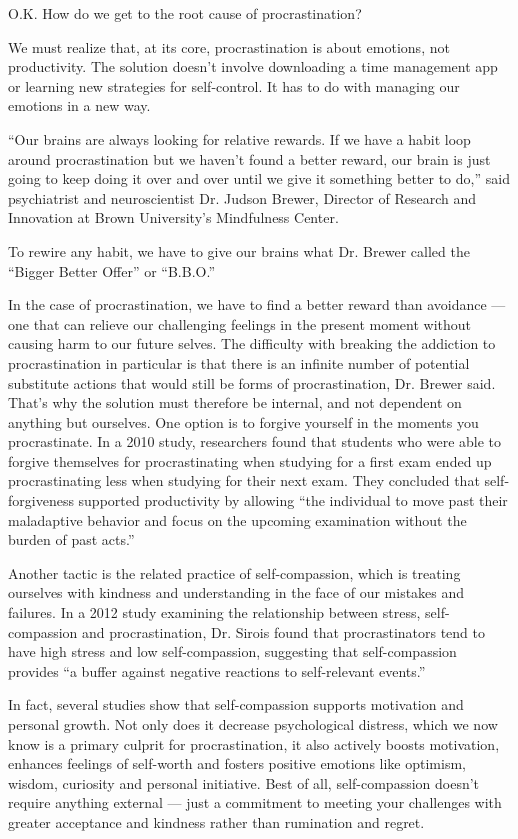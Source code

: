 \documentclass[10pt,a4paper]{book}
\begin{document}
O.K. How do we get to the root cause of procrastination?

We must realize that, at its core, procrastination is about emotions, not productivity. The solution doesn’t involve downloading a time management app or learning new strategies for self-control. It has to do with managing our emotions in a new way.

“Our brains are always looking for relative rewards. If we have a habit loop around procrastination but we haven’t found a better reward, our brain is just going to keep doing it over and over until we give it something better to do,” said psychiatrist and neuroscientist Dr. Judson Brewer, Director of Research and Innovation at Brown University’s Mindfulness Center.

To rewire any habit, we have to give our brains what Dr. Brewer called the “Bigger Better Offer” or “B.B.O.”

In the case of procrastination, we have to find a better reward than avoidance — one that can relieve our challenging feelings in the present moment without causing harm to our future selves. The difficulty with breaking the addiction to procrastination in particular is that there is an infinite number of potential substitute actions that would still be forms of procrastination, Dr. Brewer said. That’s why the solution must therefore be internal, and not dependent on anything but ourselves.
One option is to forgive yourself in the moments you procrastinate. In a 2010 study, researchers found that students who were able to forgive themselves for procrastinating when studying for a first exam ended up procrastinating less when studying for their next exam. They concluded that self-forgiveness supported productivity by allowing “the individual to move past their maladaptive behavior and focus on the upcoming examination without the burden of past acts.”

Another tactic is the related practice of self-compassion, which is treating ourselves with kindness and understanding in the face of our mistakes and failures. In a 2012 study examining the relationship between stress, self-compassion and procrastination, Dr. Sirois found that procrastinators tend to have high stress and low self-compassion, suggesting that self-compassion provides “a buffer against negative reactions to self-relevant events.”

In fact, several studies show that self-compassion supports motivation and personal growth. Not only does it decrease psychological distress, which we now know is a primary culprit for procrastination, it also actively boosts motivation, enhances feelings of self-worth and fosters positive emotions like optimism, wisdom, curiosity and personal initiative. Best of all, self-compassion doesn’t require anything external — just a commitment to meeting your challenges with greater acceptance and kindness rather than rumination and regret.
\end{document}
